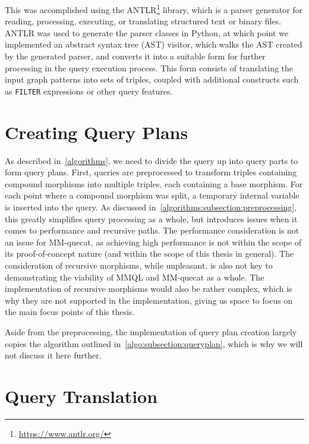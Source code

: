 This was accomplished using the ANTLR\footnote{\url{https://www.antlr.org/}} library, which is a parser generator for reading, processing, executing, or translating structured text or binary files.
ANTLR was used to generate the parser classes in Python, at which point we implemented an abstract syntax tree (AST) visitor, which walks the AST created by the generated parser, and converts it into a suitable form for further processing in the query execution process.
This form consists of translating the input graph patterns into sets of triples, coupled with additional constructs such as \texttt{FILTER} expressions or other query features.

\section{Creating Query Plans}

As described in~\cref{algorithms}, we need to divide the query up into query parts to form query plans.
First, queries are preprocessed to transform triples containing compound morphisms into multiple triples, each containing a base morphism.
For each point where a compound morphism was split, a temporary internal variable is inserted into the query.
As discussed in~\cref{algorithms:subsection:preprocessing}, this greatly simplifies query processing as a whole, but introduces issues when it comes to performance and recursive paths.
The performance consideration is not an issue for MM-quecat, as achieving high performance is not within the scope of its proof-of-concept nature (and within the scope of this thesis in general).
The consideration of recursive morphisms, while unpleasant, is also not key to demonstrating the viability of MMQL and MM-quecat as a whole.
The implementation of recursive morphisms would also be rather complex, which is why they are not supported in the implementation, giving us space to focus on the main focus points of this thesis.

Aside from the preprocessing, the implementation of query plan creation largely copies the algorithm outlined in~\cref{algo:subsection:queryplan}, which is why we will not discuss it here further.

\section{Query Translation}


